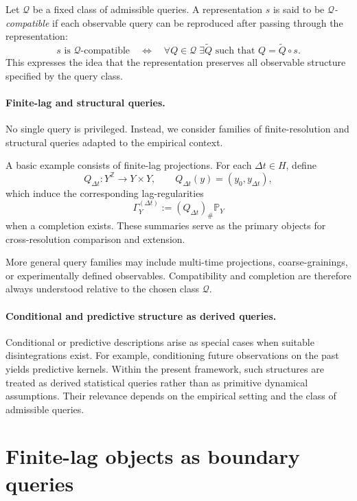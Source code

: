 \documentclass[11pt]{article}
\begin{document}
Let $\mathcal Q$ be a fixed class of admissible queries.  A representation
$s$ is said to be \emph{$\mathcal Q$-compatible} if each observable query can be reproduced after
passing through the representation:
\[
s \text{ is } \mathcal Q\text{-compatible}
\quad \Longleftrightarrow \quad
\forall Q \in \mathcal Q \; \exists \widetilde Q \text{ such that } Q = \widetilde Q \circ s.
\]
This expresses the idea that the representation preserves all observable structure specified by
the query class.

\paragraph{Finite-lag and structural queries.}
No single query is privileged.  Instead, we consider families of finite-resolution and
structural queries adapted to the empirical context.

A basic example consists of finite-lag projections.  For each $\Delta t \in H$, define
\[
Q_{\Delta t} : Y^{\mathbb Z} \to Y \times Y,
\qquad
Q_{\Delta t}(y) = (y_0, y_{\Delta t}),
\]
which induce the corresponding lag-regularities
\[
\Gamma_Y^{(\Delta t)} := (Q_{\Delta t})_\# \mathbb P_Y
\]
when a completion exists.  These summaries serve as the primary objects for
cross-resolution comparison and extension.

More general query families may include multi-time projections, coarse-grainings, or
experimentally defined observables.  Compatibility and completion are therefore always
understood relative to the chosen class $\mathcal Q$.

\paragraph{Conditional and predictive structure as derived queries.}
Conditional or predictive descriptions arise as special cases when suitable disintegrations
exist.  For example, conditioning future observations on the past yields predictive kernels.
Within the present framework, such structures are treated as derived statistical queries rather
than as primitive dynamical assumptions.  Their relevance depends on the empirical setting and
the class of admissible queries.


\section{Finite-lag objects as boundary queries}
\end{document}
